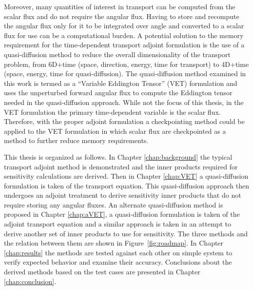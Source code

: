 \documentclass[12pt]{report}
\begin{document}
Moreover, many quantities of interest in transport can be computed from the scalar flux and do not require the angular flux. Having to store and recompute the angular flux only for it to be integrated over angle and converted to a scalar flux for use can be a computational burden. A potential solution to the memory requirement for the time-dependent transport adjoint formulation is the use of a quasi-diffusion method to reduce the overall dimensionality of the transport problem, from 6D+time (space, direction, energy, time for transport) to 4D+time (space, energy, time for quasi-diffusion). The quasi-diffusion method examined in this work is termed  as a ``Variable Eddington Tensor'' (VET) formulation and uses the unperturbed forward angular flux to compute the Eddington tensor needed in the quasi-diffusion approach. While not the focus of this thesis, in the VET formulation the primary time-dependent variable is the scalar flux. Therefore, with the proper adjoint formulation a checkpointing method could be applied to the VET formulation in which scalar flux are checkpointed as a method to further reduce memory requirements.

This thesis is organized as follows. In Chapter \ref{chap:background} the typical transport adjoint method is demonstrated and the inner products required for sensitivity calculations are derived. Then in Chapter \ref{chap:VET} a quasi-diffusion formulation is taken of the transport equation. This quasi-diffusion approach then undergoes an adjoint treatment to derive sensitivity inner products that do not require storing any angular fluxes. An alternate quasi-diffusion method is proposed in Chapter \ref{chap:aVET}, a quasi-diffusion formulation is taken of the adjoint transport equation and a similar approach is taken in an attempt to derive another set of inner products to use for sensitivity. The three methods and the relation between them are shown in Figure~\ref{fig:roadmap}. In Chapter \ref{chap:results} the methods are tested against each other on simple system to verify expected behavior and examine their accuracy. Conclusions about the derived methods based on the test cases are presented in Chapter \ref{chap:conclusion}.
\end{document}
